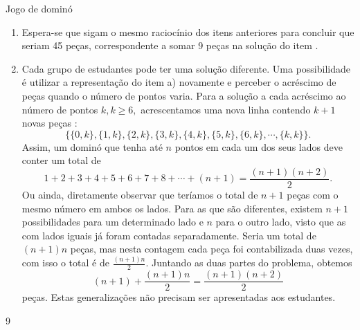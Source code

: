 \begin{answer}{Jogo de dominó}
{\begin{enumerate}
Assim, teríamos que ter um dominó com peças formadas de pontos variando de 0 a 7 para que possa ter participação de 5 jogadores, mantendo a regra de que todos iniciem o jogo com $7$ peças.

\item Espera-se que sigam o mesmo raciocínio dos itens anteriores para concluir que seriam 45 peças, correspondente a somar 9 peças na solução do item .

\item Cada grupo de estudantes pode ter uma solução diferente. Uma possibilidade é utilizar a representação do item a) novamente e perceber o acréscimo de peças quando o número de pontos varia. Para a solução  a cada acréscimo ao número de pontos $k, k \geq 6,$  acrescentamos uma nova linha contendo $k+1$ novas peças : 
\[\{\{0,k\}, \{1,k\}, \{2,k\}, \{3,k\}, \{4,k\}, \{5,k\}, \{6,k\},\cdots,  \{k,k\}\}.\]
Assim, um dominó que tenha até $n$ pontos em cada um dos seus lados deve conter um total de  
\[1+2+3+4+5+6+7+8+ \cdots + (n+1) = \frac{(n+1)(n+2)}{2}. \] 
Ou ainda, diretamente observar que teríamos o total de $n+1$ peças com o mesmo número em ambos os lados. Para as que são diferentes, existem $n+1$ possibilidades para um determinado lado e $n$ para o outro lado, visto que as com lados iguais já foram contadas separadamente. Seria um total de $(n+1)n$ peças, mas nesta contagem cada peça foi contabilizada duas vezes, com isso o total é de $\frac{(n+1)n}{2}$. Juntando as duas partes do problema, obtemos $$(n+1) + \frac{(n+1)n}{2} =\frac{(n+1)(n+2)}{2} $$ peças. Estas generalizações não precisam ser apresentadas aos estudantes.
\end{enumerate}
\columnbreak
\phantom{a}
}{9}
\end{answer}
\clearmargin

